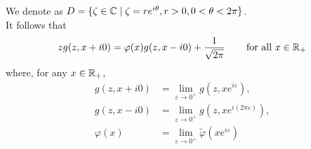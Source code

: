 \documentclass[11pt]{amsart}
\begin{document}
We denote as $D = \{ \zeta \in \mathbb{C} \mid \zeta = re^{i\theta}, r > 0, 0 < \theta < 2\pi \}$. \\

It follows that 
\begin{align}
    \label{eq:WH3.5}
    zg(z, x+i0) = \varphi(x)g(z, x-i0) + \frac{1}{\sqrt{2\pi}} \, \qquad \text{for all $x\in\mathbb{R}_+$}
\end{align}
where, for any $x \in \mathbb{R}_+$, 
\begin{align*}
    g(z, x+i0) &= \lim_{\varepsilon\to 0^+}  g(z, xe^{i\varepsilon}),\\
    g(z, x-i0) &= \lim_{\varepsilon\to 0^+}  g(z, xe^{i(2\pi\varepsilon)}),\\
    \varphi(x) &= \lim_{\varepsilon\to 0^+}\tilde \varphi(xe^{i\varepsilon})
\end{align*}
\end{document}
